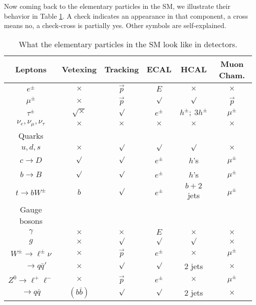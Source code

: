 \documentclass[prd,aps,floats,preprintnumbers,preprint,superscriptaddress,floatfix,nofootinbib]{revtex4}
\begin{document}
Now coming back to the elementary particles in the SM, we 
illustrate their behavior  in Table \ref{detectsm}. 
A check indicates an appearance in that component, a cross
means no, a check-cross is partially yes. Other symbols are self-explained.

\begin{table}[htb]
\begin{tabular}{|c|c c c c c |} 
\hline
Leptons  & Vetexing   & Tracking &  ECAL &  HCAL & Muon Cham. \\
\hline$e^\pm$ & $\times$ & $\vec p$ &   $E$   &   $\times$        & $\times$      \\
$\mu^\pm$  &  $\times$ &  $\vec p$   &   $\surd$    &  $\surd$   & $\vec p$ \\
$\tau^\pm$  & $\surd\times$  & $\surd $   &   $e^\pm$    &  $h^\pm;\ 3h^\pm$   & $\mu^\pm$ \\
$\nu_e,\nu_\mu,\nu_\tau$ & $\times$  & $\times$      &   $\times$   &   $\times$    & $\times$     \\
\hline
Quarks  &  & & & & \\
\hline
$u,d,s$ &  $\times$ & $\surd$  & $\surd$  & $\surd$     & $\times$      \\
$c\to D$    &  $\surd$ &   $\surd$ &   $e^\pm$    &  $h$'s  & $\mu^\pm$ \\
$b\to B$   &  $\surd$  & $\surd$   &   $e^\pm$    &  $h$'s  & $\mu^\pm$ \\
$t\to bW^\pm$ &  $b$  &  $\surd$  &   $e^\pm$    &  $b+2$ jets  & $\mu^\pm$ \\
\hline
Gauge bosons  &  & & & & \\
\hline
$\gamma$ & $\times$  & $\times$ &   $E$   &   $\times$        & $\times$      \\
$g$  &  $\times$ &  $\surd$  &   $\surd$    &  $\surd$   & $\times$ \\
$W^\pm\to \ell^\pm \nu$ &  $\times$ & $\vec p$  &   $e^\pm$    &  $\times$  & $\mu^\pm$ \\
$\quad~ \to q\bar q'$ &  $\times$ &  $\surd$ &   $\surd$    &  2 jets  & $\times$ \\
$ Z^0\to \ell^+\ell^-$ &  $\times$  & $\vec p$  &   $e^\pm$    &  $\times$ & $\mu^\pm$ \\
$ \to q\bar q$ &  $(b\bar b)$  & $\surd$  &   $\surd$    &  2 jets  & $\times$ \\
\hline
\end{tabular}
\caption{What the elementary particles in the SM look like in detectors.}
\label{detectsm} 
\end{table}
\end{document}

